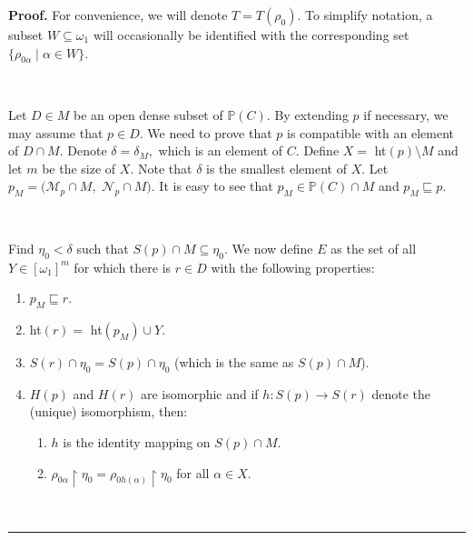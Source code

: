 \documentclass{article}
\newenvironment{proof}[1][Proof]{\noindent\textbf{#1.} }{\ \rule{0.5em}{0.5em}}
\begin{document}
\begin{proof}
For convenience, we will denote $T=T\left(  \rho_{0}\right)  .$ To simplify
notation, a subset $W\subseteq\omega_{1}$ will occasionally be identified with
the corresponding set $\{\rho_{0\alpha}\mid\alpha\in W\}.$

\qquad\ \qquad\ \qquad\ \qquad\ \qquad\ \qquad\ 

Let $D\in M$ be an open dense subset of $\mathbb{P}\left(  C\right)  $. By
extending $p$ if necessary, we may assume that $p\in D.$ We need to prove that
$p$ is compatible with an element of $D\cap M.$ Denote $\delta=\delta_{M},$
which is an element of $C.$ Define $X=$ \textsf{ht}$\left(  p\right)
\setminus M$ and let $m$ be the size of $X.$ Note that $\delta$ is the
smallest element of $X.$ Let $p_{M}=(\mathcal{M}_{p}\cap M,$ $\mathcal{N}%
_{p}\cap M).$ It is easy to see that $p_{M}\in\mathbb{P}\left(  C\right)  \cap
M$ and $p_{M}\sqsubseteq p.$

\qquad\ \qquad\ \qquad\ \ \ 

Find $\eta_{0}<\delta$ such that $S\left(  p\right)  \cap M\subseteq\eta_{0}.$
We now define $E$ as the set of all $Y\in\left[  \omega_{1}\right]  ^{m}$ for
which there is $r\in D$ with the following properties:

\begin{enumerate}
\item $p_{M}\sqsubseteq r.$

\item \textsf{ht}$\left(  r\right)  =$ \textsf{ht}$\left(  p_{M}\right)  \cup
Y.$

\item $S\left(  r\right)  \cap\eta_{0}=S\left(  p\right)  \cap\eta_{0}$ (which
is the same as $S\left(  p\right)  \cap M$).

\item $H\left(  p\right)  $ and $H\left(  r\right)  $ are isomorphic and if
$h:S\left(  p\right)  \longrightarrow S\left(  r\right)  $ denote the (unique)
isomorphism, then:

\begin{enumerate}
\item $h$ is the identity mapping on $S\left(  p\right)  \cap M.$

\item $\rho_{0\alpha}\upharpoonright\eta_{0}=\rho_{0h\left(  \alpha\right)
}\upharpoonright\eta_{0}$ for all $\alpha\in X.$
\end{enumerate}
\end{enumerate}


\end{proof}
\end{document}

